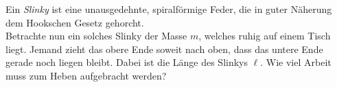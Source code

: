 \begin{Exercise}[label = slinky1, origin = P.Gnädig, difficulty = 4, title = Fallendes Slinky]
	Ein \textit{Slinky} ist eine unausgedehnte, spiralförmige Feder, die in guter Näherung dem Hookschen Gesetz gehorcht.\\
	Betrachte nun ein solches Slinky der Masse $m$, welches ruhig auf einem Tisch liegt. Jemand zieht das obere Ende soweit nach oben, dass das untere Ende gerade noch liegen bleibt. Dabei ist die Länge des Slinkys $\ell$. Wie viel Arbeit muss zum Heben aufgebracht werden?
\end{Exercise}

	
